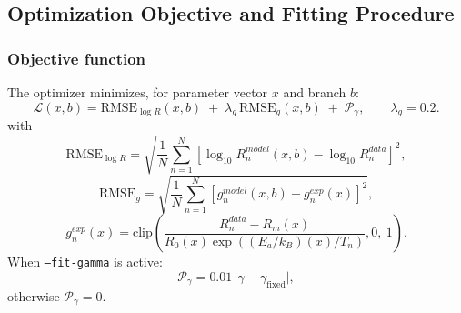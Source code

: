 \documentclass[11pt]{article}
\begin{document}
\subsection{Optimization Objective and Fitting Procedure}
\subsubsection*{Objective function}
The optimizer minimizes, for parameter vector \(x\) and branch \(b\):
\begin{equation}
\mathcal{L}(x,b)
=
\mathrm{RMSE}_{\log R}(x,b)
\;+\;
\lambda_g\,\mathrm{RMSE}_{g}(x,b)
\;+\;
\mathcal{P}_\gamma,
\qquad
\lambda_g=0.2.
\label{eq:fit_objective}
\end{equation}
with
\begin{equation}
\mathrm{RMSE}_{\log R}
=
\sqrt{\frac{1}{N}\sum_{n=1}^{N}
\left[
\log_{10}R_n^{model}(x,b)-\log_{10}R_n^{data}
\right]^2},
\label{eq:fit_rmse_r}
\end{equation}
\begin{equation}
\mathrm{RMSE}_{g}
=
\sqrt{\frac{1}{N}\sum_{n=1}^{N}
\left[g_n^{model}(x,b)-g_n^{exp}(x)\right]^2},
\label{eq:fit_rmse_g}
\end{equation}
\begin{equation}
g_n^{exp}(x)
=
\mathrm{clip}\!\left(
\frac{R_n^{data}-R_m(x)}
{R_0(x)\exp((E_a/k_B)(x)/T_n)},
0,\ 1
\right).
\label{eq:fit_g_exp}
\end{equation}
When \texttt{--fit-gamma} is active:
\[
\mathcal{P}_\gamma=0.01\,\lvert \gamma-\gamma_{\mathrm{fixed}}\rvert,
\]
otherwise \(\mathcal{P}_\gamma=0\).
\end{document}
